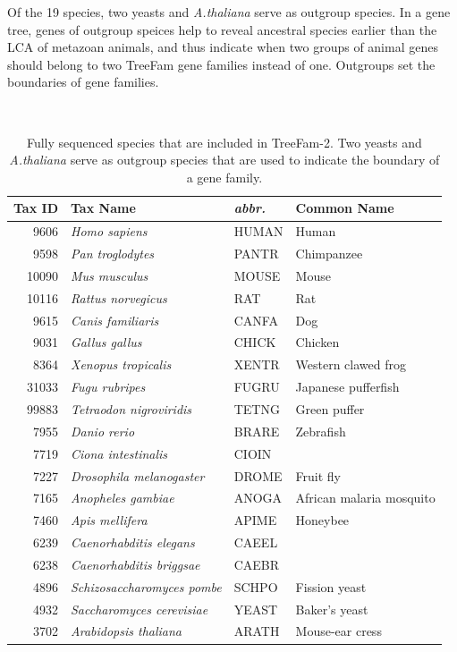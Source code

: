 Of the 19 species, two yeasts and {\it A.thaliana} serve as outgroup species. In a gene tree, genes of outgroup speices
help to reveal ancestral species earlier than the LCA of metazoan animals, and thus indicate
when two groups of animal genes should belong to two TreeFam gene families instead of one.
Outgroups set the boundaries of gene families.

\begin{table}[!hb]
\begin{center}
{\tt
\begin{tabular}{|r|l|l|l|}
\hline
Tax ID & Tax Name & {\it abbr.}	& Common Name\\
\hline
9606	& {\it Homo sapiens}				& HUMAN & Human\\
9598	& {\it Pan troglodytes}				& PANTR & Chimpanzee\\
10090	& {\it Mus musculus}				& MOUSE & Mouse\\
10116	& {\it Rattus norvegicus}			& RAT 	& Rat\\
9615	& {\it Canis familiaris}			& CANFA & Dog\\
9031	& {\it Gallus gallus}				& CHICK & Chicken\\
8364	& {\it Xenopus tropicalis}		& XENTR & Western clawed frog\\
31033	& {\it Fugu rubripes}			& FUGRU & Japanese pufferfish\\
99883	& {\it Tetraodon nigroviridis}	& TETNG & Green puffer\\
7955	& {\it Danio rerio}				& BRARE & Zebrafish\\
7719	& {\it Ciona intestinalis}		& CIOIN & \\
7227	& {\it Drosophila melanogaster}	& DROME & Fruit fly\\
7165	& {\it Anopheles gambiae}		& ANOGA & African malaria mosquito\\
7460	& {\it Apis mellifera}			& APIME & Honeybee\\
6239	& {\it Caenorhabditis elegans}	& CAEEL & \\
6238	& {\it Caenorhabditis briggsae}	& CAEBR & \\
4896	& {\it Schizosaccharomyces pombe}	& SCHPO & Fission yeast\\
4932	& {\it Saccharomyces cerevisiae}	& YEAST & Baker's yeast\\
3702	& {\it Arabidopsis thaliana}		& ARATH & Mouse-ear cress\\
\hline
\end{tabular}
}
\caption[Fully sequenced species that are included in TreeFam-2]
{Fully sequenced species that are included in TreeFam-2. Two yeasts and {\it A.thaliana} serve
as outgroup species that are used to indicate the boundary of a gene family.}~\label{tab:species}
\end{center}
\end{table}

